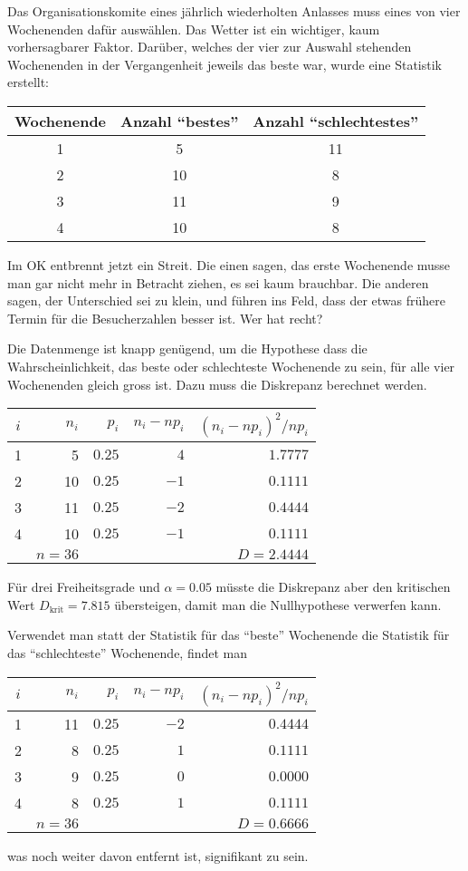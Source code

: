 Das Organisationskomite eines jährlich wiederholten Anlasses muss
eines von vier Wochenenden dafür auswählen.
Das Wetter ist ein wichtiger, kaum vorhersagbarer Faktor.
Darüber, welches der vier zur Auswahl stehenden Wochenenden
in der Vergangenheit jeweils das beste war, wurde eine Statistik
erstellt:
\begin{center}
\begin{tabular}{ccc}
\hline
Wochenende&Anzahl ``bestes''&Anzahl ``schlechtestes''\\
\hline
1&5&11\\
2&10&8\\
3&11&9\\
4&10&8\\
\hline
\end{tabular}
\end{center}
Im OK entbrennt jetzt ein Streit. Die einen sagen, das erste Wochenende
musse man gar nicht mehr in Betracht ziehen, es sei kaum brauchbar.
Die anderen sagen, der Unterschied sei zu klein, und führen ins Feld,
dass der etwas frühere Termin für die Besucherzahlen besser ist.
Wer hat recht?

\begin{loesung}
Die Datenmenge ist knapp genügend, um die Hypothese
dass die Wahrscheinlichkeit, das beste oder schlechteste Wochenende zu sein,
für alle vier Wochenenden gleich gross ist.
Dazu muss die Diskrepanz berechnet werden.
\begin{center}
\begin{tabular}{|crrrr|}
\hline
$i$& $n_i$& $p_i$&$n_i-np_i$&$(n_i-np_i)^2/np_i$\\
\hline
  1&     5&$0.25$&$ 4$&$1.7777$\\
  2&    10&$0.25$&$-1$&$0.1111$\\
  3&    11&$0.25$&$-2$&$0.4444$\\
  4&    10&$0.25$&$-1$&$0.1111$\\
\hline
   &$n=36$&      &      &$D=2.4444$\\
\hline
\end{tabular}
\end{center}
Für drei Freiheitsgrade und $\alpha=0.05$ müsste die Diskrepanz
aber den kritischen Wert $D_{\text{krit}}=7.815$ übersteigen, damit
man die Nullhypothese verwerfen kann.

Verwendet man statt der Statistik für das ``beste'' Wochenende
die Statistik für das ``schlechteste'' Wochenende, findet man
\begin{center}
\begin{tabular}{|crrrr|}
\hline
$i$& $n_i$& $p_i$&$n_i-np_i$&$(n_i-np_i)^2/np_i$\\
\hline
  1&    11&$0.25$&$-2$&$0.4444$\\
  2&     8&$0.25$&$1$&$0.1111$\\
  3&     9&$0.25$&$0$&$0.0000$\\
  4&     8&$0.25$&$1$&$0.1111$\\
\hline
   &$n=36$&      &      &$D=0.6666$\\
\hline
\end{tabular}
\end{center}
was noch weiter davon entfernt ist, signifikant zu sein.
\end{loesung}

